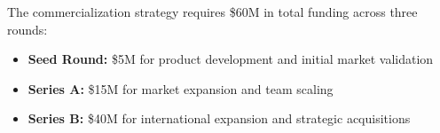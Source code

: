 The commercialization strategy requires \$60M in total funding across three rounds:

\begin{itemize}
    \item \textbf{Seed Round:} \$5M for product development and initial market validation
    \item \textbf{Series A:} \$15M for market expansion and team scaling  
    \item \textbf{Series B:} \$40M for international expansion and strategic acquisitions
\end{itemize}

